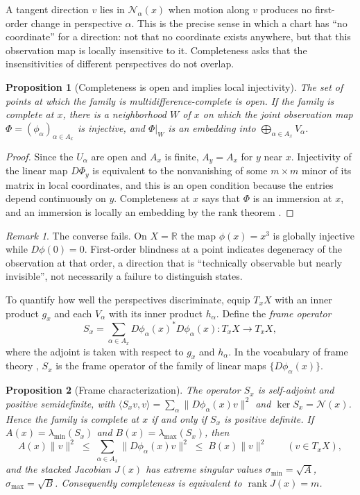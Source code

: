 \documentclass[11pt]{article}
\newtheorem{proposition}{Proposition}
\theoremstyle{remark}
\newtheorem{remark}{Remark}
\newcommand{\R}{\mathbb{R}}
\newcommand{\N}{\mathcal{N}}
\newcommand{\rank}{\operatorname{rank}}
\begin{document}
A tangent direction $v$ lies in $\N_\alpha(x)$ when motion along $v$ produces no first-order change in perspective $\alpha$. This is the precise sense in which a chart has ``no coordinate'' for a direction: not that no coordinate exists anywhere, but that this observation map is locally insensitive to it. Completeness asks that the insensitivities of different perspectives do not overlap.

\begin{proposition}[Completeness is open and implies local injectivity]\label{prop:open}
The set of points at which the family is multidifference-complete is open. If the family is complete at $x$, there is a neighborhood $W$ of $x$ on which the joint observation map $\Phi=(\phi_\alpha)_{\alpha\in A_x}$ is injective, and $\Phi|_W$ is an embedding into $\bigoplus_{\alpha\in A_x}V_\alpha$.
\end{proposition}

\begin{proof}
Since the $U_\alpha$ are open and $A_x$ is finite, $A_y=A_x$ for $y$ near $x$. Injectivity of the linear map $D\Phi_y$ is equivalent to the nonvanishing of some $m\times m$ minor of its matrix in local coordinates, and this is an open condition because the entries depend continuously on $y$. Completeness at $x$ says that $\Phi$ is an immersion at $x$, and an immersion is locally an embedding by the rank theorem \cite{lee}.
\end{proof}

\begin{remark}
The converse fails. On $X=\R$ the map $\phi(x)=x^3$ is globally injective while $D\phi(0)=0$. First-order blindness at a point indicates degeneracy of the observation at that order, a direction that is ``technically observable but nearly invisible'', not necessarily a failure to distinguish states.
\end{remark}

To quantify how well the perspectives discriminate, equip $T_xX$ with an inner product $g_x$ and each $V_\alpha$ with its inner product $h_\alpha$. Define the \emph{frame operator}
\[
S_x=\sum_{\alpha\in A_x}D\phi_\alpha(x)^{*}D\phi_\alpha(x):T_xX\to T_xX,
\]
where the adjoint is taken with respect to $g_x$ and $h_\alpha$. In the vocabulary of frame theory \cite{christensen}, $S_x$ is the frame operator of the family of linear maps $\{D\phi_\alpha(x)\}$.

\begin{proposition}[Frame characterization]\label{prop:frame}
The operator $S_x$ is self-adjoint and positive semidefinite, with $\langle S_xv,v\rangle=\sum_{\alpha}\|D\phi_\alpha(x)v\|^2$ and $\ker S_x=\N(x)$. Hence the family is complete at $x$ if and only if $S_x$ is positive definite. If $A(x)=\lambda_{\min}(S_x)$ and $B(x)=\lambda_{\max}(S_x)$, then
\[
A(x)\|v\|^2\;\le\;\sum_{\alpha\in A_x}\|D\phi_\alpha(x)v\|^2\;\le\;B(x)\|v\|^2
\qquad(v\in T_xX),
\]
and the stacked Jacobian $J(x)$ has extreme singular values $\sigma_{\min}=\sqrt{A}$, $\sigma_{\max}=\sqrt{B}$. Consequently completeness is equivalent to $\rank J(x)=m$.
\end{proposition}
\end{document}
